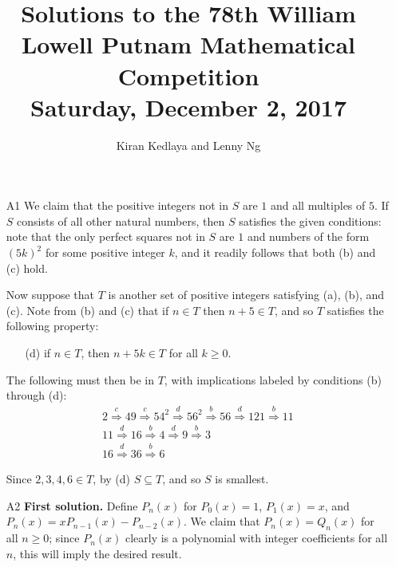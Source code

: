 \documentclass[amssymb,twocolumn,pra,10pt,aps]{revtex4-1}
\begin{document}
\title{Solutions to the 78th William Lowell Putnam Mathematical Competition \\
    Saturday, December 2, 2017}
\author{Kiran Kedlaya and Lenny Ng}
\noaffiliation
\maketitle

\begin{itemize}
\item[A1]
We claim that the positive integers not in $S$ are $1$ and all multiples of $5$. If $S$ consists of all other natural numbers, then $S$ satisfies the given conditions: note that the only perfect squares not in $S$ are $1$ and numbers of the form $(5k)^2$ for some positive integer $k$, and it readily follows that both (b) and (c) hold.


Now suppose that $T$ is another set of positive integers satisfying (a), (b), and (c). Note from (b) and (c) that if $n \in T$ then $n+5 \in T$, and so $T$ satisfies the following property: 
\begin{itemize}
\item[(d)]
if $n\in T$, then $n+5k \in T$ for all $k \geq 0$.
\end{itemize} 
The following must then be in $T$, with implications labeled by conditions (b) through (d):
\begin{gather*}
2 \stackrel{c}{\Rightarrow} 49 \stackrel{c}{\Rightarrow} 54^2 \stackrel{d}{\Rightarrow} 56^2 \stackrel{b}{\Rightarrow} 56 \stackrel{d}{\Rightarrow} 121 \stackrel{b}{\Rightarrow} 11 \\
11 \stackrel{d}{\Rightarrow} 16 \stackrel{b}{\Rightarrow} 4 \stackrel{d}{\Rightarrow} 9 \stackrel{b}{\Rightarrow} 3 \\
16 \stackrel{d}{\Rightarrow} 36 \stackrel{b}{\Rightarrow} 6
\end{gather*}

Since $2,3,4,6 \in T$, by (d) $S \subseteq T$, and so $S$ is smallest.

\item[A2]
\textbf{First solution.}
Define $P_n(x)$ for $P_0(x) = 1$, $P_1(x) = x$, and $P_n(x) = x 
P_{n-1}(x)-P_{n-2}(x)$. We claim that $P_n(x) = Q_n(x)$ for all $n \geq 0$;
since $P_n(x)$ clearly is a polynomial 
with integer coefficients for all $n$, this will imply the desired result.


\end{itemize}
\end{document}
